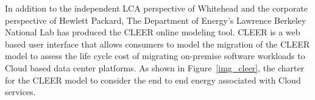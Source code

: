     In addition to the independent LCA perspective of Whitehead and the corporate perspective of Hewlett Packard, The Department of Energy's Lawrence Berkeley National Lab  has produced the CLEER online modeling tool\cite{CLEER13}. CLEER is a web based user interface that allows consumers to model the migration of the CLEER model to assess the life cycle cost of migrating on-premise software workloads to Cloud based data center platforms. As shown in Figure~\ref{img_cleer}, the charter for the CLEER model to consider the end to end energy associated with Cloud services.
    
    
    

    
    
